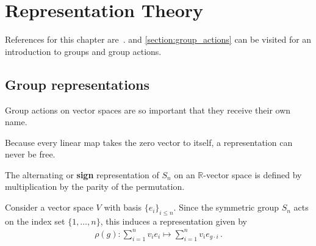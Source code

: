 \chapter{Representation Theory}

    References for this chapter are~\citet{jeevanjee_introduction_2015,fulton_representation_2004}.  and \cref{section:group_actions} can be visited for an introduction to groups and group actions.

    \minitoc

\section{Group representations}

    Group actions on vector spaces are so important that they receive their own name.
    \begin{property}[Freeness]
        Because every linear map takes the zero vector to itself, a representation can never be free.
    \end{property}


    \begin{example}\label{rep:sign_representation}
        The alternating or \textbf{sign} representation of $S_n$ on an $\mathbb{R}$-vector space is defined by multiplication by the parity of the permutation.
    \end{example}

    \begin{example}\label{rep:permutation}
        Consider a vector space $V$ with basis $\{e_i\}_{i\leq n}$. Since the symmetric group $S_n$ acts on the index set $\{1,\ldots,n\}$, this induces a representation given by
        \begin{gather}
            \rho(g):\sum_{i=1}^nv_ie_i\mapsto\sum_{i=1}^nv_ie_{g\cdot i}\,.
        \end{gather}
    \end{example}

